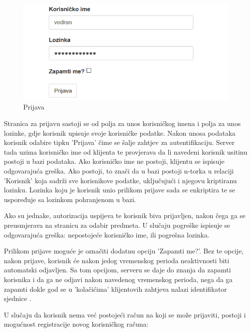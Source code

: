 \documentclass[times, utf8, zavrsni]{fer}
\begin{document}
\begin{figure}[H]
\centering
\includegraphics[scale=0.7]{img/prijava.png}
\caption{Prijava}
\label{fig:prijava}
\end{figure}

Stranica za prijavu sastoji se od polja za unos korisničkog imena i polja za unos lozinke, gdje korisnik upisuje svoje korisničke podatke. Nakon unosa podataka korisnik odabire tipku 'Prijava' čime se šalje zahtjev za autentifikaciju. Server tada uzima korisničko ime od klijenta te provjerava da li navedeni korisnik usitinu postoji u bazi podataka. Ako korisničko ime ne postoji, klijentu se ispisuje odgovarajuća greška. Ako postoji, to znači da u bazi postoji n-torka u relaciji 'Korisnik' koja sadrži sve korisnikove podatke, uključujući i njegovu kriptiranu lozinku. Lozinka koju je korisnik unio prilikom prijave sada se enkriptira te se uspoređuje sa lozinkom pohranjenom u bazi.

\lstset{style=csharp}


Ako su jednake, autorizacija uspijeva te korisnik biva prijavljen, nakon čega ga se preusmjerava na stranicu za odabir predmeta. U slučaju pogreške ispisuje se odgovarajuća greška: nepostojeće korisničko ime, ili pogrešna lozinka.

Prilikom prijave moguće je označiti dodatnu opciju 'Zapamti me?'. Bez te opcije, nakon prijave, korisnik će nakon jedog vremenskog perioda neaktivnosti biti automatski odjavljen. Sa tom opcijom, serveru se daje do znanja da zapamti korisnika i da ga ne odjavi nakon navedenog vremenskog perioda, nega da ga zapamti dokle god se u 'kolačićima' klijentovih zahtjeva nalazi identifikator sjednice .

U slučaju da korisnik nema već postojeći račun na koji se može prijaviti, postoji i mogućnost registracije novog korisničkog računa:
\end{document}
